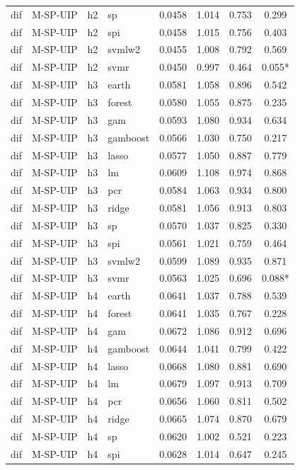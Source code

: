 \begin{ThreePartTable}
\begin{longtable}[t]{llclcccc}
dif & M-SP-UIP & h2 & sp & 0.0458 & 1.014 & 0.753 & 0.299\\
dif & M-SP-UIP & h2 & spi & 0.0458 & 1.015 & 0.756 & 0.403\\
dif & M-SP-UIP & h2 & svmlw2 & 0.0455 & 1.008 & 0.792 & 0.569\\
dif & M-SP-UIP & h2 & svmr & 0.0450 & 0.997 & 0.464 & 0.055*\\
\addlinespace
dif & M-SP-UIP & h3 & earth & 0.0581 & 1.058 & 0.896 & 0.542\\
dif & M-SP-UIP & h3 & forest & 0.0580 & 1.055 & 0.875 & 0.235\\
dif & M-SP-UIP & h3 & gam & 0.0593 & 1.080 & 0.934 & 0.634\\
dif & M-SP-UIP & h3 & gamboost & 0.0566 & 1.030 & 0.750 & 0.217\\
dif & M-SP-UIP & h3 & lasso & 0.0577 & 1.050 & 0.887 & 0.779\\
dif & M-SP-UIP & h3 & lm & 0.0609 & 1.108 & 0.974 & 0.868\\
dif & M-SP-UIP & h3 & pcr & 0.0584 & 1.063 & 0.934 & 0.800\\
dif & M-SP-UIP & h3 & ridge & 0.0581 & 1.056 & 0.913 & 0.803\\
dif & M-SP-UIP & h3 & sp & 0.0570 & 1.037 & 0.825 & 0.330\\
dif & M-SP-UIP & h3 & spi & 0.0561 & 1.021 & 0.759 & 0.464\\
dif & M-SP-UIP & h3 & svmlw2 & 0.0599 & 1.089 & 0.935 & 0.871\\
dif & M-SP-UIP & h3 & svmr & 0.0563 & 1.025 & 0.696 & 0.088*\\
\addlinespace
dif & M-SP-UIP & h4 & earth & 0.0641 & 1.037 & 0.788 & 0.539\\
dif & M-SP-UIP & h4 & forest & 0.0641 & 1.035 & 0.767 & 0.228\\
dif & M-SP-UIP & h4 & gam & 0.0672 & 1.086 & 0.912 & 0.696\\
dif & M-SP-UIP & h4 & gamboost & 0.0644 & 1.041 & 0.799 & 0.422\\
dif & M-SP-UIP & h4 & lasso & 0.0668 & 1.080 & 0.881 & 0.690\\
dif & M-SP-UIP & h4 & lm & 0.0679 & 1.097 & 0.913 & 0.709\\
dif & M-SP-UIP & h4 & pcr & 0.0656 & 1.060 & 0.811 & 0.502\\
dif & M-SP-UIP & h4 & ridge & 0.0665 & 1.074 & 0.870 & 0.679\\
dif & M-SP-UIP & h4 & sp & 0.0620 & 1.002 & 0.521 & 0.223\\
dif & M-SP-UIP & h4 & spi & 0.0628 & 1.014 & 0.647 & 0.245\\

\end{longtable}
\end{ThreePartTable}
